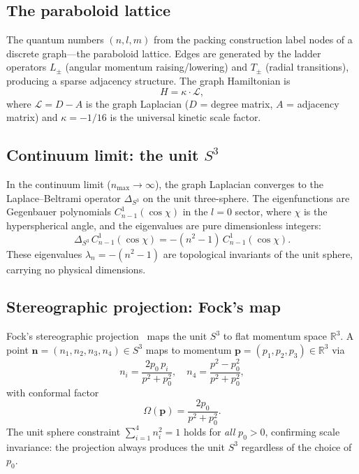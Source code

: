 \documentclass[aps,pra,twocolumn,superscriptaddress,longbibliography]{revtex4-2}
\begin{document}
\subsection{The paraboloid lattice}

The quantum numbers $(n, l, m)$ from the packing construction label
nodes of a discrete graph---the paraboloid lattice.  Edges are generated
by the ladder operators $L_\pm$ (angular momentum raising/lowering) and
$T_\pm$ (radial transitions), producing a sparse adjacency structure.
The graph Hamiltonian is
\begin{equation}
H = \kappa \cdot \mathcal{L},
\label{eq:graph_hamiltonian}
\end{equation}
where $\mathcal{L} = D - A$ is the graph Laplacian ($D$ = degree
matrix, $A$ = adjacency matrix) and $\kappa = -1/16$ is the universal
kinetic scale factor.

\subsection{Continuum limit: the unit $S^3$}

In the continuum limit ($n_{\max} \to \infty$), the graph Laplacian
converges to the Laplace--Beltrami operator $\Delta_{S^3}$ on the unit
three-sphere.  The eigenfunctions are Gegenbauer polynomials
$C_{n-1}^1(\cos\chi)$ in the $l = 0$ sector, where $\chi$ is the
hyperspherical angle, and the eigenvalues are pure dimensionless
integers:
\begin{equation}
\Delta_{S^3}\, C_{n-1}^1(\cos\chi) = -(n^2 - 1)\, C_{n-1}^1(\cos\chi).
\label{eq:s3_eigenvalues}
\end{equation}
These eigenvalues $\lambda_n = -(n^2 - 1)$ are topological invariants
of the unit sphere, carrying no physical dimensions.

\subsection{Stereographic projection: Fock's map}

Fock's stereographic projection~\cite{Fock1935} maps the unit $S^3$ to
flat momentum space $\mathbb{R}^3$.  A point
$\mathbf{n} = (n_1, n_2, n_3, n_4) \in S^3$ maps to momentum
$\mathbf{p} = (p_1, p_2, p_3) \in \mathbb{R}^3$ via
\begin{equation}
n_i = \frac{2p_0\, p_i}{p^2 + p_0^2}, \quad
n_4 = \frac{p^2 - p_0^2}{p^2 + p_0^2},
\label{eq:stereographic}
\end{equation}
with conformal factor
\begin{equation}
\Omega(\mathbf{p}) = \frac{2p_0}{p^2 + p_0^2}.
\label{eq:conformal_factor}
\end{equation}
The unit sphere constraint $\sum_{i=1}^{4} n_i^2 = 1$ holds for
\textit{all} $p_0 > 0$, confirming scale invariance: the projection
always produces the unit $S^3$ regardless of the choice of $p_0$.
\end{document}
